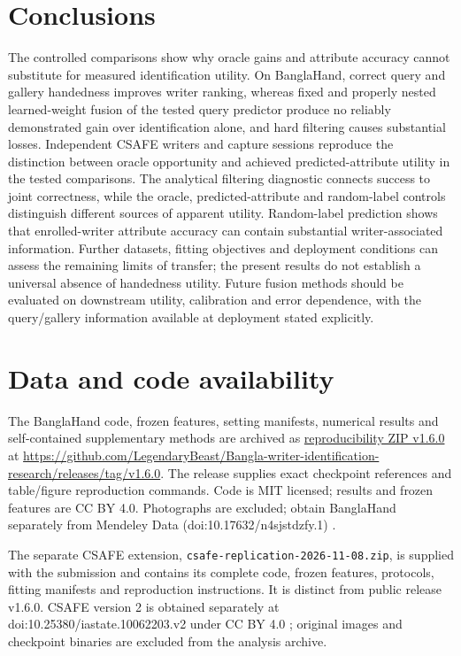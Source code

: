 \documentclass[ASNA,twocolumn]{USG}
\begin{document}
\section{Conclusions}
The controlled comparisons show why oracle gains and attribute accuracy cannot substitute for measured identification utility. On BanglaHand, correct query and gallery handedness improves writer ranking, whereas fixed and properly nested learned-weight fusion of the tested query predictor produce no reliably demonstrated gain over identification alone, and hard filtering causes substantial losses. Independent CSAFE writers and capture sessions reproduce the distinction between oracle opportunity and achieved predicted-attribute utility in the tested comparisons. The analytical filtering diagnostic connects success to joint correctness, while the oracle, predicted-attribute and random-label controls distinguish different sources of apparent utility. Random-label prediction shows that enrolled-writer attribute accuracy can contain substantial writer-associated information. Further datasets, fitting objectives and deployment conditions can assess the remaining limits of transfer; the present results do not establish a universal absence of handedness utility. Future fusion methods should be evaluated on downstream utility, calibration and error dependence, with the query/gallery information available at deployment stated explicitly.

\section*{Data and code availability}
The BanglaHand code, frozen features, setting manifests, numerical results and self-contained supplementary methods are archived as \href{https://github.com/LegendaryBeast/Bangla-writer-identification-research/releases/download/v1.6.0/wid-reproducibility-v1.6.0.zip}{reproducibility ZIP v1.6.0} at \url{https://github.com/LegendaryBeast/Bangla-writer-identification-research/releases/tag/v1.6.0}. The release supplies exact checkpoint references and table/figure reproduction commands. Code is MIT licensed; results and frozen features are CC BY 4.0. Photographs are excluded; obtain BanglaHand separately from Mendeley Data (doi:10.17632/n4sjstdzfy.1) \cite{banglahand2026data}.



 The separate CSAFE extension, \texttt{csafe-replication-2026-11-08.zip}, is supplied with the submission and contains its complete code, frozen features, protocols, fitting manifests and reproduction instructions. It is distinct from public release v1.6.0. CSAFE version 2 is obtained separately at doi:10.25380/iastate.10062203.v2 under CC BY 4.0 \cite{crawford2026csafe}; original images and checkpoint binaries are excluded from the analysis archive.
\end{document}
